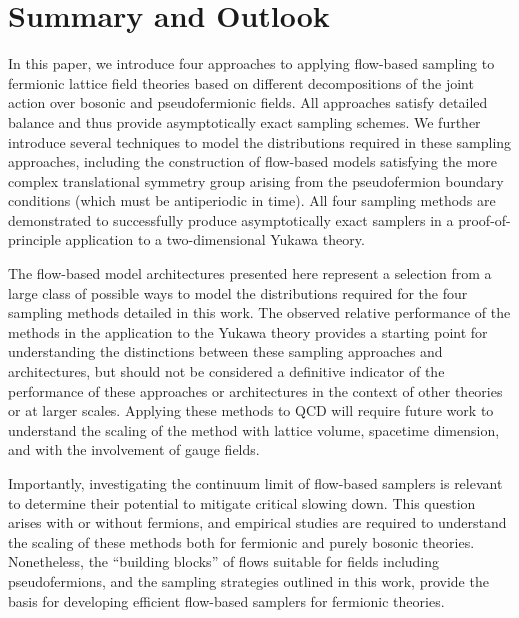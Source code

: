 \documentclass[aps,prd,twocolumn,nofootinbib,superscriptaddress,preprintnumbers]{revtex4-1}
\begin{document}
\vfill\null

\section{Summary and Outlook}
\label{sec:summary}

In this paper, we introduce four approaches to applying flow-based sampling to fermionic lattice field theories based on different decompositions of the joint action over bosonic and pseudofermionic fields. All approaches satisfy detailed balance and thus provide asymptotically exact sampling schemes. We further introduce several techniques to model the distributions required in these sampling approaches, including the construction of flow-based models satisfying the more complex translational symmetry group arising from the pseudofermion boundary conditions (which must be antiperiodic in time). All four sampling methods are demonstrated to successfully produce asymptotically exact samplers in a proof-of-principle application to a two-dimensional Yukawa theory.

The flow-based model architectures presented here represent a selection from a large class of possible ways to model the distributions required for the four sampling methods detailed in this work. The observed relative performance of the methods in the application to the Yukawa theory provides a starting point for understanding the distinctions between these sampling approaches and architectures, but should not be considered a definitive indicator of the performance of these approaches or architectures in the context of other theories or at larger scales. Applying these methods to QCD will require future work to understand the scaling of the method with lattice volume, spacetime dimension, and with the involvement of gauge fields.

Importantly, investigating the continuum limit of flow-based samplers is relevant to determine their potential to mitigate critical slowing down. This question arises with or without fermions, and empirical studies are required to understand the scaling of these methods both for fermionic and purely bosonic theories. Nonetheless, the ``building blocks'' of flows suitable for fields including pseudofermions, and the sampling strategies outlined in this work, provide the basis for developing efficient flow-based samplers for fermionic theories. 
\end{document}
